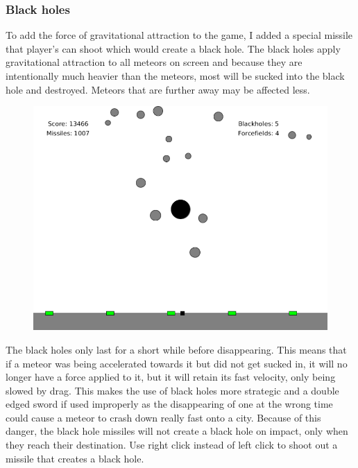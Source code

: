 \documentclass{article}
\begin{document}
\subsubsection*{Black holes}
To add the force of gravitational attraction to the game, I added a special missile that player's can shoot which would create a black hole. The black holes apply gravitational attraction to all meteors on screen and because they are intentionally much heavier than the meteors, most will be sucked into the black hole and destroyed. Meteors that are further away may be affected less.
\begin{figure}[H]
\centering
\includegraphics[width=1\textwidth]{imgs/Blackhole.png}
\end{figure}
The black holes only last for a short while before disappearing. This means that if a meteor was being accelerated towards it but did not get sucked in, it will no longer have a force applied to it, but it will retain its fast velocity, only being slowed by drag. This makes the use of black holes more strategic and a double edged sword if used improperly as the disappearing of one at the wrong time could cause a meteor to crash down really fast onto a city. Because of this danger, the black hole missiles will not create a black hole on impact, only when they reach their destination. Use right click instead of left click to shoot out a missile that creates a black hole.
 
\end{document}
